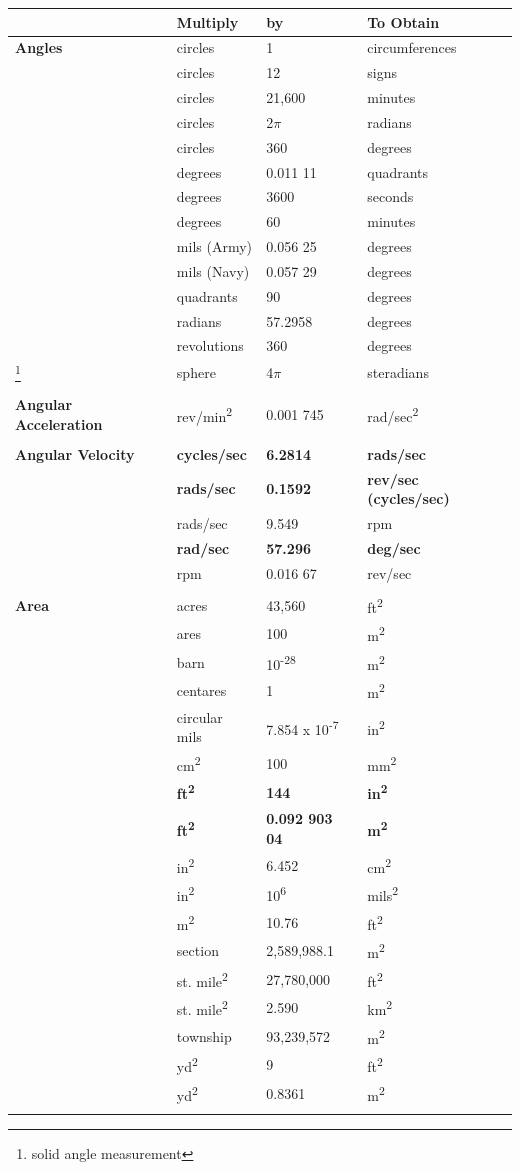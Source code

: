 \documentclass[
]{book}
\begin{document}
\begin{longtable}[]{@{}llll@{}}
\toprule
& Multiply & by & To Obtain\tabularnewline
\midrule
\endhead
\textbf{Angles} & circles & 1 & circumferences\tabularnewline
& circles & 12 & signs\tabularnewline
& circles & 21,600 & minutes\tabularnewline
& circles & 2\(\pi\) & radians\tabularnewline
& circles & 360 & degrees\tabularnewline
& degrees & 0.011 11 & quadrants\tabularnewline
& degrees & 3600 & seconds\tabularnewline
& degrees & 60 & minutes\tabularnewline
& mils (Army) & 0.056 25 & degrees\tabularnewline
& mils (Navy) & 0.057 29 & degrees\tabularnewline
& quadrants & 90 & degrees\tabularnewline
& radians & 57.2958 & degrees\tabularnewline
& revolutions & 360 & degrees\tabularnewline
\footnote{solid angle measurement} & sphere & 4\(\pi\) & steradians\tabularnewline
& & &\tabularnewline
\textbf{Angular Acceleration} & rev/min\textsuperscript{2} & 0.001 745 & rad/sec\textsuperscript{2}\tabularnewline
& & &\tabularnewline
\textbf{Angular Velocity} & \textbf{cycles/sec} & \textbf{6.2814} & \textbf{rads/sec}\tabularnewline
& \textbf{rads/sec} & \textbf{0.1592} & \textbf{rev/sec (cycles/sec)}\tabularnewline
& rads/sec & 9.549 & rpm\tabularnewline
& \textbf{rad/sec} & \textbf{57.296} & \textbf{deg/sec}\tabularnewline
& rpm & 0.016 67 & rev/sec\tabularnewline
& & &\tabularnewline
\textbf{Area} & acres & 43,560 & ft\textsuperscript{2}\tabularnewline
& ares & 100 & m\textsuperscript{2}\tabularnewline
& barn & 10\textsuperscript{-28} & m\textsuperscript{2}\tabularnewline
& centares & 1 & m\textsuperscript{2}\tabularnewline
& circular mils & 7.854 x 10\textsuperscript{-7} & in\textsuperscript{2}\tabularnewline
& cm\textsuperscript{2} & 100 & mm\textsuperscript{2}\tabularnewline
& \textbf{ft\textsuperscript{2}} & \textbf{144} & \textbf{in\textsuperscript{2}}\tabularnewline
& \textbf{ft\textsuperscript{2}} & \textbf{0.092 903 04} & \textbf{m\textsuperscript{2}}\tabularnewline
& in\textsuperscript{2} & 6.452 & cm\textsuperscript{2}\tabularnewline
& in\textsuperscript{2} & 10\textsuperscript{6} & mils\textsuperscript{2}\tabularnewline
& m\textsuperscript{2} & 10.76 & ft\textsuperscript{2}\tabularnewline
& section & 2,589,988.1 & m\textsuperscript{2}\tabularnewline
& st. mile\textsuperscript{2} & 27,780,000 & ft\textsuperscript{2}\tabularnewline
& st. mile\textsuperscript{2} & 2.590 & km\textsuperscript{2}\tabularnewline
& township & 93,239,572 & m\textsuperscript{2}\tabularnewline
& yd\textsuperscript{2} & 9 & ft\textsuperscript{2}\tabularnewline
& yd\textsuperscript{2} & 0.8361 & m\textsuperscript{2}\tabularnewline
& & &\tabularnewline

\end{longtable}
\end{document}
